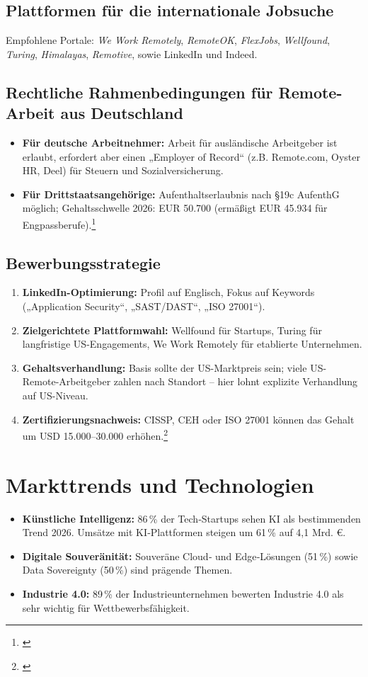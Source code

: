 \documentclass[10pt,a4paper]{article}
\begin{document}
	\subsection{Plattformen für die internationale Jobsuche}
	Empfohlene Portale: \textit{We Work Remotely}, \textit{RemoteOK}, \textit{FlexJobs}, \textit{Wellfound}, \textit{Turing}, \textit{Himalayas}, \textit{Remotive}, sowie LinkedIn und Indeed.
	
	\subsection{Rechtliche Rahmenbedingungen für Remote-Arbeit aus Deutschland}
	\begin{itemize}
		\item \textbf{Für deutsche Arbeitnehmer:} Arbeit für ausländische Arbeitgeber ist erlaubt, erfordert aber einen „Employer of Record“ (z.B. Remote.com, Oyster HR, Deel) für Steuern und Sozialversicherung.
		\item \textbf{Für Drittstaatsangehörige:} Aufenthaltserlaubnis nach §19c AufenthG möglich; Gehaltsschwelle 2026: EUR 50.700 (ermäßigt EUR 45.934 für Engpassberufe).\footnote{\cite{GermanVisaLaw,EUBlueCard}}
	\end{itemize}
	
	\subsection{Bewerbungsstrategie}
	\begin{enumerate}
		\item \textbf{LinkedIn-Optimierung:} Profil auf Englisch, Fokus auf Keywords („Application Security“, „SAST/DAST“, „ISO 27001“).
		\item \textbf{Zielgerichtete Plattformwahl:} Wellfound für Startups, Turing für langfristige US-Engagements, We Work Remotely für etablierte Unternehmen.
		\item \textbf{Gehaltsverhandlung:} Basis sollte der US-Marktpreis sein; viele US-Remote-Arbeitgeber zahlen nach Standort – hier lohnt explizite Verhandlung auf US-Niveau.
		\item \textbf{Zertifizierungsnachweis:} CISSP, CEH oder ISO 27001 können das Gehalt um USD 15.000–30.000 erhöhen.\footnote{\cite{Jobs4BW}}
	\end{enumerate}
	
	\section{Markttrends und Technologien}
	\begin{itemize}
		\item \textbf{Künstliche Intelligenz:} 86\,\% der Tech‑Startups sehen KI als bestimmenden Trend 2026. Umsätze mit KI‑Plattformen steigen um 61\,\% auf 4,1 Mrd. €.
		\item \textbf{Digitale Souveränität:} Souveräne Cloud‑ und Edge‑Lösungen (51\,\%) sowie Data Sovereignty (50\,\%) sind prägende Themen.
		\item \textbf{Industrie 4.0:} 89\,\% der Industrieunternehmen bewerten Industrie 4.0 als sehr wichtig für Wettbewerbsfähigkeit.
	\end{itemize}
	
\end{document}
